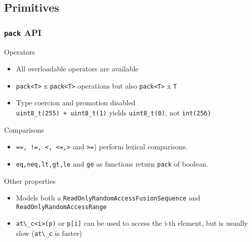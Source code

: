 \subsection{Primitives}

\frame
{
  \frametitle{\texttt{pack} API}
	
  \begin{block}{Operators}
	\begin{itemize}
   \footnotesize
		\item All overloadable operators are available
		\item \lstinline{pack<T>} x \lstinline{pack<T>} operations but also \lstinline{pack<T>} x \lstinline{T}
		\item Type coercion and promotion disabled\\
		      \lstinline{uint8_t(255) + uint8_t(1)} yields \lstinline{uint8_t(0)}, not \lstinline{int(256)}
	\end{itemize}	
	\end{block}{}

	\begin{block}{Comparisons}
	 \begin{itemize}
\footnotesize
	\item \texttt{==, !=, <, <=,>} and \texttt{>=}) perform lexical comparisons.
	\item \texttt{eq,neq,lt,gt,le} and \texttt{ge} as functions return \texttt{pack} of boolean.
\end{itemize}
\end{block}{}
\begin{block}{Other properties}
	\begin{itemize}
   \footnotesize
		\item Models both a \texttt{ReadOnlyRandomAccessFusionSequence} and \texttt{ReadOnlyRandomAccessRange}
		\item \lstinline{at\_c<i>(p)} or \lstinline{p[i]} can be used to access the i-th element, but is usually slow (\lstinline{at\_c} is faster)
	\end{itemize}
	\end{block}{}
}

